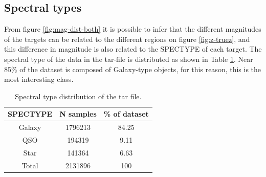 \subsection{Spectral types}
From figure \ref{fig:mag-dist-both} it is possible to infer that the different magnitudes of the targets can be related to the different regions on figure \ref{fig:z-truez}, and this difference in magnitude is also related to the SPECTYPE of each target. The spectral type of the data in the tar-file is distributed as shown in Table \ref{tab:espectype-N}. Near 85\% of the dataset is composed of Galaxy-type objects, for this reason, this is the most interesting class.
\begin{table}[!h]
	\centering
\begin{tabular}{c|c|c}

	SPECTYPE & N samples & \% of dataset \\ 
	\hline 
	Galaxy & 1796213 & 84.25 \\ 

	QSO & 194319 & 9.11 \\ 

	Star & 141364 & 6.63 \\ 

	Total & 2131896 & 100 \\ 

\end{tabular} 
\caption{Spectral type distribution of the tar file. }
\label{tab:espectype-N}
\end{table}
